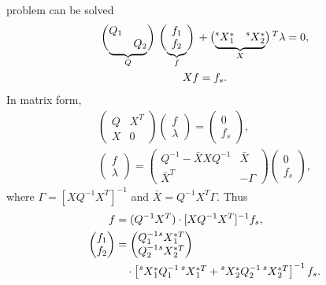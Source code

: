  problem can be solved 
\begin{gather}
\underbracedmatrix{Q_1 & \\ & Q_2}{Q} \underbracedmatrix{f_1\\f_2}{f} + \underbracedmatrix{\prescript{s}{}{X}_1^* & \prescript{s}{}{X}_2^* }{X}^T \lambda = 0,\label{eq:Q1Q2def}\\
X f = f_s.\end{gather}
In matrix form,
\begin{gather}
\begin{pmatrix} Q & X^T\\X &0\end{pmatrix} \begin{pmatrix} f \\\lambda\end{pmatrix} = \begin{pmatrix} 0\\ f_s\end{pmatrix},\\
 \begin{pmatrix} f \\\lambda\end{pmatrix}
 = \begin{pmatrix}
 Q^{-1}-\bar X XQ^{-1} &
  \bar X\\
 \bar X^T &
 -\Gamma
 \end{pmatrix}
 \begin{pmatrix} 0\\ f_s\end{pmatrix}, \label{eq:inversion}\end{gather}
where $\Gamma=[XQ^{-1}X^T]^{-1}$ and $\bar X = Q^{-1}X^T \Gamma$. Thus\begin{align}
f &= \ta{(Q^{-1}X^T)\cdot[XQ^{-1}X^T]^{-1}} f_s,\\
\begin{pmatrix} f_1\\f_2\end{pmatrix} &= \begin{pmatrix}Q_1^{-1} {\prescript{s}{}{X}_1^{*T}} \\ Q_2^{-1} {\prescript{s}{}{X}_2^{*T}}\end{pmatrix}\nonumber\\
&\ta{\rule{1em}{0pt}\cdot \begin{bmatrix} {\prescript{s}{}{X}_1^*}Q_1^{-1}{\,\prescript{s}{}{X}_1^{*T}}+{\prescript{s}{}{X}_2^*}Q_2^{-1}{\,\prescript{s}{}{X}_2^{*T}}\end{bmatrix}^{-1}} f_s\ta{.}
\end{align}

